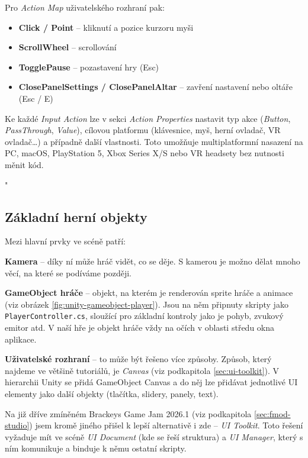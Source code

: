 Pro \emph{Action Map} uživatelského rozhraní pak:

\begin{itemize}
    \item \textbf{Click / Point} -- kliknutí a pozice kurzoru myši
    \item \textbf{ScrollWheel} -- scrollování
    \item \textbf{TogglePause} -- pozastavení hry (Esc)
    \item \textbf{ClosePanelSettings / ClosePanelAltar} -- zavření nastavení nebo oltáře (Esc / E)
\end{itemize}

Ke každé \emph{Input Action} lze v sekci \emph{Action Properties} nastavit typ akce (\emph{Button}, \emph{PassThrough}, \emph{Value}), cílovou platformu (klávesnice, myš, herní ovladač, VR ovladač\dots) a případně další vlastnosti. Toto umožňuje multiplatformní nasazení na PC, macOS, PlayStation 5, Xbox Series X/S nebo VR headsety bez nutnosti měnit kód.




"
\subsection{Základní herní objekty}
\label{sec:zakladni-herni-objekty}

Mezi hlavní prvky ve scéně patří:

\textbf{Kamera} -- díky ní může hráč vidět, co se děje. S kamerou je možno dělat mnoho věcí, na které se podíváme později.

\textbf{GameObject hráče} -- objekt, na kterém je renderován sprite hráče a animace (viz obrázek \ref{fig:unity-gameobject-player}). Jsou na něm připnuty skripty jako \texttt{PlayerController.cs}, sloužící pro základní kontroly jako je pohyb, zvukový emitor atd. V naší hře je objekt hráče vždy na očích v oblasti středu okna aplikace.

\textbf{Uživatelské rozhraní} -- to může být řešeno více způsoby. Způsob, který najdeme ve většině tutoriálů, je \emph{Canvas} (viz podkapitola \ref{sec:ui-toolkit}). V hierarchii Unity se přidá GameObject Canvas a do něj lze přidávat jednotlivé UI elementy jako další objekty (tlačítka, slidery, panely, text).

Na již dříve zmíněném Brackeys Game Jam 2026.1 (viz podkapitola \ref{sec:fmod-studio}) jsem kromě jiného přišel k lepší alternativě i zde -- \emph{UI Toolkit}. Toto řešení vyžaduje mít ve scéně \emph{UI Document} (kde se řeší struktura) a \emph{UI Manager}, který s ním komunikuje a binduje k němu ostatní skripty.

